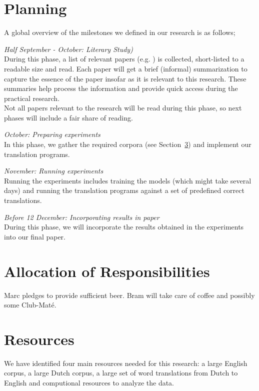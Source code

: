 \section{Planning}
A global overview of the milestones we defined in our research is as follows;
\begin{description}
  \item \emph{Half September - October: Literary Study)}\\
    During this phase, a list of relevant papers (e.g. \cite{levy2014linguistic, mikolov2013exploiting, wolf2014joint}) is collected, short-listed to a readable size and read. Each paper will get a brief (informal) summarization to capture the essence of the paper insofar as it is relevant to this research. These summaries help process the information and provide quick access during the practical research.\\

    Not all papers relevant to the research will be read during this phase, so next phases will include a fair share of reading.
  \item \emph{October: Preparing experiments}\\
    In this phase, we gather the required corpora (see Section~\ref{sec:resources}) and implement our translation programs.
  \item \emph{November: Running experiments}\\
    Running the experiments includes training the models (which might take several days) and running the translation programs against a set of predefined correct translations.
  \item \emph{Before 12 December: Incorporating results in paper}\\
    During this phase, we will incorporate the results obtained in the experiments into our final paper.
\end{description}

\section{Allocation of Responsibilities}
Marc pledges to provide sufficient beer. Bram will take care of coffee and possibly some Club-Maté.


\section{Resources}
\label{sec:resources}
We have identified four main resources needed for this research: a large English corpus, a large Dutch corpus, a large set of word translations from Dutch to English and computional resources to analyze the data.

